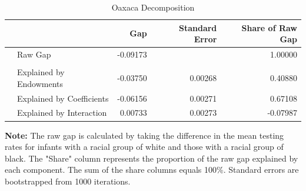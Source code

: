 \begin{table}[ht]
\centering
\caption{Oaxaca Decomposition} 
\begin{tabular}{rlrrr}
  \hline
 &  & Gap & Standard Error & Share of Raw Gap \\ 
  \hline
 &  Raw Gap& -0.09173 &  & 1.00000 \\\\ 
   & \phantom{Raw }Explained by Endowments & -0.03750 & 0.00268 & 0.40880 \\ 
   & \phantom{Raw }Explained by Coefficients & -0.06156 & 0.00271 & 0.67108 \\ 
   & \phantom{Raw }Explained by Interaction & 0.00733 & 0.00273 & -0.07987 \\ 
   \hline
\end{tabular}
\label{tab:oaxaca_results}
\parbox{\textwidth}{\smallskip \textbf{Note:}  The raw gap is calculated by taking the difference in the mean testing rates for infants with a racial group of white and those with a racial group of black. The "Share" column represents the proportion of the raw gap explained by each component. The sum of the share columns equals 100\%. Standard errors are bootstrapped from 1000 iterations.}
\end{table}
